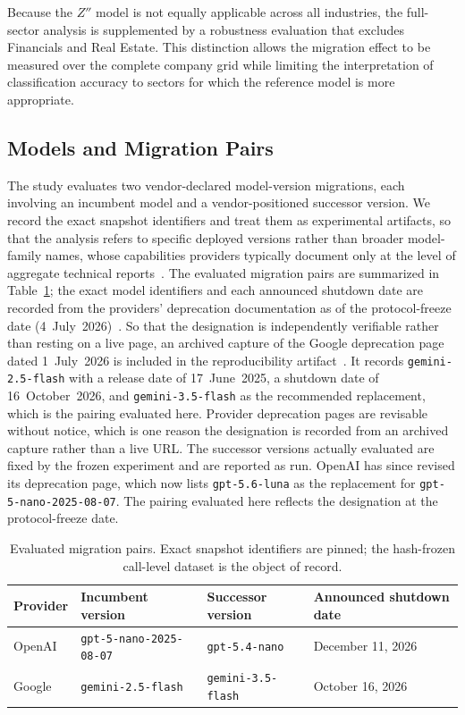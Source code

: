 \documentclass{ieeeaccess}
\begin{document}
Because the $Z''$ model is not equally applicable across all industries, the full-sector analysis is supplemented by a robustness evaluation that excludes Financials and Real Estate. This distinction allows the migration effect to be measured over the complete company grid while limiting the interpretation of classification accuracy to sectors for which the reference model is more appropriate.

\subsection{Models and Migration Pairs}
The study evaluates two vendor-declared model-version migrations, each involving an incumbent model and a vendor-positioned successor version. We record the exact snapshot identifiers and treat them as experimental artifacts, so that the analysis refers to specific deployed versions rather than broader model-family names, whose capabilities providers typically document only at the level of aggregate technical reports~\cite{gpt4}. The evaluated migration pairs are summarized in Table~\ref{tab:models}; the exact model identifiers and each announced shutdown date are recorded from the providers' deprecation documentation as of the protocol-freeze date (4~July~2026)~\cite{openai_dep,google_dep}. So that the designation is independently verifiable rather than resting on a live page, an archived capture of the Google deprecation page dated 1~July~2026 is included in the reproducibility artifact~\cite{google_dep_archive}. It records \texttt{gemini-2.5-flash} with a release date of 17~June~2025, a shutdown date of 16~October~2026, and \texttt{gemini-3.5-flash} as the recommended replacement, which is the pairing evaluated here. Provider deprecation pages are revisable without notice, which is one reason the designation is recorded from an archived capture rather than a live URL. The successor versions actually evaluated are fixed by the frozen experiment and are reported as run. OpenAI has since revised its deprecation page, which now lists \texttt{gpt-5.6-luna} as the replacement for \texttt{gpt-5-nano-2025-08-07}. The pairing evaluated here reflects the designation at the protocol-freeze date.

\begin{table}[t]
\centering
\caption{Evaluated migration pairs. Exact snapshot identifiers are pinned; the hash-frozen call-level dataset is the object of record.}
\label{tab:models}
\begin{tabular}{@{}llll@{}}
\toprule
Provider & Incumbent version & Successor version & Announced shutdown date \\
\midrule
OpenAI & \texttt{gpt-5-nano-2025-08-07} & \texttt{gpt-5.4-nano} & December 11, 2026 \\
Google & \texttt{gemini-2.5-flash} & \texttt{gemini-3.5-flash} & October 16, 2026 \\
\bottomrule
\end{tabular}
\end{table}
\end{document}
